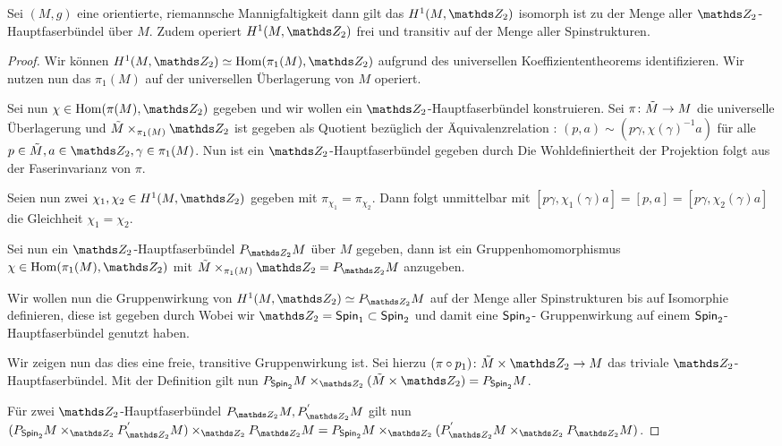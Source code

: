 \begin{Satz}\label{anzahlspin}
	Sei $ (M,g) $ eine orientierte, riemannsche Mannigfaltigkeit dann
	gilt das $ H^1(M,\Z_2) $ isomorph ist zu der Menge aller $ \Z_2 $-Hauptfaserbündel über $ M $. Zudem operiert $ H^1(M,\Z_2) $ frei
	und transitiv auf der Menge aller Spinstrukturen. 
	\begin{proof}
		Wir können $ H^1(M,\Z_2)\simeq \Hom(\pi_1(M),\Z_2) $ aufgrund des universellen
		Koeffiziententheorems identifizieren. Wir nutzen nun das $ \pi_1(M) $
		auf der universellen Überlagerung von $ M $ operiert.
		
		Sei nun $ \chi\in\Hom(\pi(M),\Z_2) $ gegeben und wir wollen
		ein $ \Z_2 $-Hauptfaserbündel konstruieren. Sei $ \pi \colon \tilde{M} \rightarrow M $ die universelle Überlagerung
		und $ \tilde{M}\times_{\pi_1(M)}\Z_2 $ ist gegeben als
		Quotient bezüglich der Äquivalenzrelation : $ (p,a) \sim (p\gamma,\chi(\gamma)^{-1}a) $ für alle $ p\in\tilde{M},a\in\Z_2,\gamma\in\pi_1(M) $.
		Nun ist ein $ \Z_2 $-Hauptfaserbündel gegeben durch
		Die Wohldefiniertheit der Projektion folgt aus der Faserinvarianz
		von $ \pi $.
		
		Seien nun zwei $ \chi_1,\chi_2\in H^1(M,\Z_2) $ gegeben mit $ \pi_{\chi_1}=\pi_{\chi_2} $. Dann folgt unmittelbar mit $ [p\gamma,\chi_1(\gamma)a] = [p,a] = [p\gamma,\chi_2(\gamma)a] $
		die Gleichheit $ \chi_1=\chi_2 $.
		
		Sei nun ein $ \Z_2 $-Hauptfaserbündel $ \Ph{\Z_2}{M} $ über $ M $
		gegeben, dann ist ein Gruppenhomomorphismus $ \chi\in\Hom(\pi_1(M),\Z_2) $ mit $ \tilde{M}\times_{\pi_1(M)} \Z_2 = \Ph{\Z_2}{M}$ anzugeben.
		
		Wir wollen nun die Gruppenwirkung von $ H^1(M,\Z_2)\simeq \Ph{\Z_2}{M} $ auf der Menge aller Spinstrukturen bis auf Isomorphie definieren,
		diese ist gegeben durch
		Wobei wir $ \Z_2=\spin_1\subset\spin_2 $ und damit eine $ \operatorname{\mathsf{Spin}}_2 $-
		Gruppenwirkung auf einem $ \operatorname{\mathsf{Spin}}_2 $-Hauptfaserbündel genutzt haben.
		
		Wir zeigen nun das dies eine freie, transitive Gruppenwirkung ist. Sei hierzu $ \abb{(\pi\circ p_1)}{\tilde{M}\times \Z_2}{M} $ das triviale $ \Z_2 $-Hauptfaserbündel. Mit der Definition gilt nun
		$ \Ph{\spin_2}{M} \times_{\Z_2} (\tilde{M} \times \Z_2) = \Ph{\spin_2}{M} $.
		
		Für zwei $ \Z_2 $-Hauptfaserbündel $ \Ph{\Z_2}{M},P^{'}_{\Z_2}M $
		gilt nun $ ( \Ph{\spin_2}{M} \times_{\Z_2} P^{'}_{\Z_2}M ) \times_{\Z_2} \Ph{\Z_2}{M} = \Ph{\spin_2}{M} \times_{\Z_2} (P^{'}_{\Z_2}M \times_{\Z_2} \Ph{\Z_2}{M}) $.
		
		
	\end{proof}
\end{Satz}

